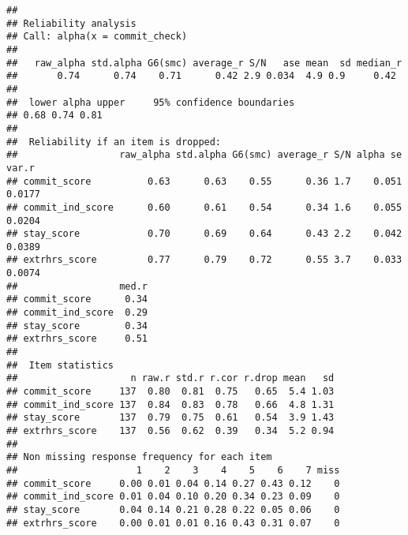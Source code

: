 \documentclass[]{article}
\newenvironment{Shaded}{\begin{snugshade}}{\end{snugshade}}
\newcommand{\CommentTok}[1]{\textcolor[rgb]{0.56,0.35,0.01}{\textit{#1}}}
\newcommand{\DataTypeTok}[1]{\textcolor[rgb]{0.13,0.29,0.53}{#1}}
\newcommand{\DecValTok}[1]{\textcolor[rgb]{0.00,0.00,0.81}{#1}}
\newcommand{\KeywordTok}[1]{\textcolor[rgb]{0.13,0.29,0.53}{\textbf{#1}}}
\newcommand{\NormalTok}[1]{#1}
\newcommand{\OperatorTok}[1]{\textcolor[rgb]{0.81,0.36,0.00}{\textbf{#1}}}
\newcommand{\StringTok}[1]{\textcolor[rgb]{0.31,0.60,0.02}{#1}}
\begin{document}
\begin{verbatim}
## 
## Reliability analysis   
## Call: alpha(x = commit_check)
## 
##   raw_alpha std.alpha G6(smc) average_r S/N   ase mean  sd median_r
##       0.74      0.74    0.71      0.42 2.9 0.034  4.9 0.9     0.42
## 
##  lower alpha upper     95% confidence boundaries
## 0.68 0.74 0.81 
## 
##  Reliability if an item is dropped:
##                  raw_alpha std.alpha G6(smc) average_r S/N alpha se  var.r
## commit_score          0.63      0.63    0.55      0.36 1.7    0.051 0.0177
## commit_ind_score      0.60      0.61    0.54      0.34 1.6    0.055 0.0204
## stay_score            0.70      0.69    0.64      0.43 2.2    0.042 0.0389
## extrhrs_score         0.77      0.79    0.72      0.55 3.7    0.033 0.0074
##                  med.r
## commit_score      0.34
## commit_ind_score  0.29
## stay_score        0.34
## extrhrs_score     0.51
## 
##  Item statistics 
##                    n raw.r std.r r.cor r.drop mean   sd
## commit_score     137  0.80  0.81  0.75   0.65  5.4 1.03
## commit_ind_score 137  0.84  0.83  0.78   0.66  4.8 1.31
## stay_score       137  0.79  0.75  0.61   0.54  3.9 1.43
## extrhrs_score    137  0.56  0.62  0.39   0.34  5.2 0.94
## 
## Non missing response frequency for each item
##                     1    2    3    4    5    6    7 miss
## commit_score     0.00 0.01 0.04 0.14 0.27 0.43 0.12    0
## commit_ind_score 0.01 0.04 0.10 0.20 0.34 0.23 0.09    0
## stay_score       0.04 0.14 0.21 0.28 0.22 0.05 0.06    0
## extrhrs_score    0.00 0.01 0.01 0.16 0.43 0.31 0.07    0
\end{verbatim}

\begin{Shaded}
\end{Shaded}
\end{document}
